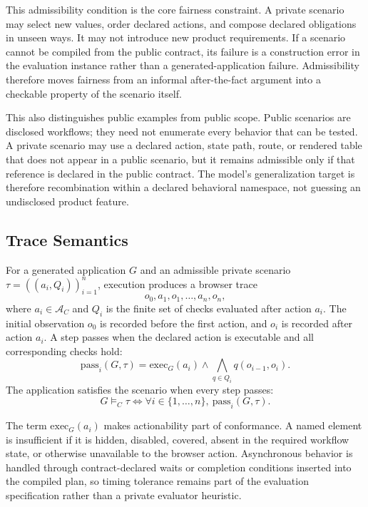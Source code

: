 This admissibility condition is the core fairness constraint. A private
scenario may select new values, order declared actions, and compose declared
obligations in unseen ways. It may not introduce new product requirements. If a
scenario cannot be compiled from the public contract, its failure is a
construction error in the evaluation instance rather than a
generated-application failure. Admissibility therefore moves fairness from an
informal after-the-fact argument into a checkable property of the scenario
itself.

This also distinguishes public examples from public scope. Public scenarios
are disclosed workflows; they need not enumerate every behavior that can be
tested. A private scenario may use a declared action, state path, route, or
rendered table that does not appear in a public scenario, but it remains
admissible only if that reference is declared in the public contract. The
model's generalization target is therefore recombination within a declared
behavioral namespace, not guessing an undisclosed product feature.

\subsection{Trace Semantics}
\label{sec:trace-semantics}

For a generated application \(G\) and an admissible private scenario
\(\tau=((a_i,Q_i))_{i=1}^{n}\), execution produces a browser trace
\begin{equation}
o_0,a_1,o_1,\ldots,a_n,o_n ,
\end{equation}
where \(a_i\in\mathcal{A}_C\) and \(Q_i\) is the finite set of checks evaluated
after action \(a_i\). The initial observation \(o_0\) is recorded before the
first action, and \(o_i\) is recorded after action \(a_i\). A step passes when
the declared action is executable and all corresponding checks hold:
\begin{equation}
\mathrm{pass}_i(G,\tau)=
\mathrm{exec}_G(a_i)
\land
\bigwedge_{q\in Q_i} q(o_{i-1},o_i).
\end{equation}
The application satisfies the scenario when every step passes:
\begin{equation}
G\models_C \tau
\iff
\forall i\in\{1,\ldots,n\},\ \mathrm{pass}_i(G,\tau).
\end{equation}

The term \(\mathrm{exec}_G(a_i)\) makes actionability part of conformance. A
named element is insufficient if it is hidden, disabled, covered, absent in the
required workflow state, or otherwise unavailable to the browser action.
Asynchronous behavior is handled through contract-declared waits or completion
conditions inserted into the compiled plan, so timing tolerance remains part of
the evaluation specification rather than a private evaluator heuristic.

